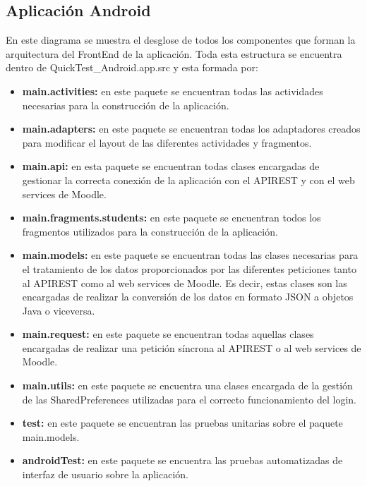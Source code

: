
\subsection{Aplicación Android}

En este diagrama se muestra el desglose de todos los componentes que forman la arquitectura del FrontEnd de la aplicación. Toda esta estructura se encuentra dentro de QuickTest\_Android.app.src y esta formada por:

\begin{itemize}

	\item \textbf{main.activities:} en este paquete se encuentran todas las actividades necesarias para la construcción de la aplicación.
	\item \textbf{main.adapters:} en este paquete se encuentran todas los adaptadores creados para modificar el layout de las diferentes actividades y fragmentos.
	\item \textbf{main.api:} en esta paquete se encuentran todas clases encargadas de gestionar la correcta conexión de la aplicación con el APIREST y con el web services de Moodle.
	\item \textbf{main.fragments.students:} en este paquete se encuentran todos los fragmentos utilizados para la construcción de la aplicación.
	\item \textbf{main.models:} en este paquete se encuentran todas las clases necesarias para el tratamiento de los datos proporcionados por las diferentes peticiones tanto al APIREST como al web services de Moodle. Es decir, estas clases son las encargadas de realizar la conversión de los datos en formato JSON a objetos Java o viceversa.
	\item \textbf{main.request:} en este paquete se encuentran todas aquellas clases encargadas de realizar una petición síncrona al APIREST o al web services de Moodle.
	\item \textbf{main.utils:} en este paquete se encuentra una clases encargada de la gestión de las SharedPreferences utilizadas para el correcto funcionamiento del login.
	\item \textbf{test:} en este paquete se encuentran las pruebas unitarias sobre el paquete main.models.
	\item \textbf{androidTest:} en este paquete se encuentra las pruebas automatizadas de interfaz de usuario sobre la aplicación.

\end{itemize}

